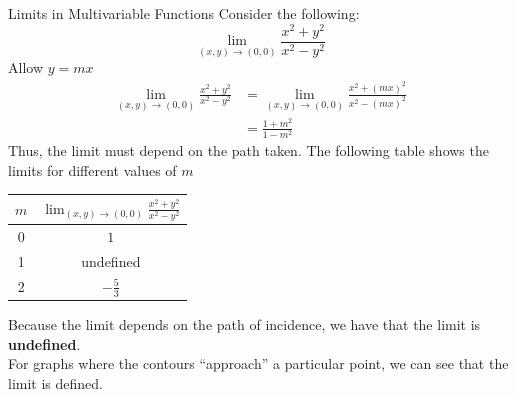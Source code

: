\documentclass[8pt]{extarticle}
\begin{document}
  \begin{problem}{Limits in Multivariable Functions}
    Consider the following:
    \[
      \lim_{(x,y)\rightarrow (0,0)} \frac{x^2 + y^2}{x^2-y^2}
    \] 
    Allow $y = mx$
    \begin{align*}
      \lim_{(x,y)\rightarrow (0,0)} \frac{x^2 + y^2}{x^2-y^2}&= \lim_{(x,y)\rightarrow (0,0)} \frac{x^2 + (mx)^2}{x^2 - (mx)^2}\\
                                                             &= \frac{1+m^2}{1-m^2}
    \end{align*}
    Thus, the limit must depend on the path taken. The following table shows the limits for different values of $m$
    \begin{center}
      \begin{tabular}{c|c}
        $m$ & $\displaystyle\lim_{(x,y)\rightarrow (0,0)} \frac{x^2 + y^2}{x^2 - y^2}$\\
        \hline
        0 & $1$\\
        1 & undefined\\
        2 & $-\frac{5}{3}$
      \end{tabular}
    \end{center}
    Because the limit depends on the path of incidence, we have that the limit is \textbf{undefined}.\\

    For graphs where the contours ``approach'' a particular point, we can see that the limit is defined.
  \end{problem}
\end{document}

